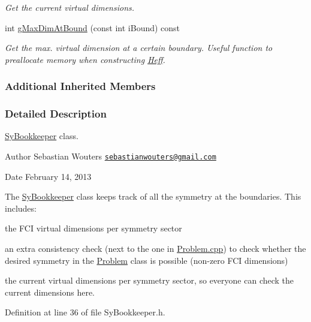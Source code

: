 \begin{DoxyCompactItemize}
\begin{DoxyCompactList}\small\item\em Get the current virtual dimensions. \end{DoxyCompactList}\item 
int \hyperlink{classCheMPS2_1_1SyBookkeeper_ad52f6f852f6f2f88c286579054c1886f}{g\-Max\-Dim\-At\-Bound} (const int i\-Bound) const 
\begin{DoxyCompactList}\small\item\em Get the max. virtual dimension at a certain boundary. Useful function to preallocate memory when constructing \hyperlink{classCheMPS2_1_1Heff}{Heff}. \end{DoxyCompactList}\end{DoxyCompactItemize}
\subsubsection*{Additional Inherited Members}


\subsubsection{Detailed Description}
\hyperlink{classCheMPS2_1_1SyBookkeeper}{Sy\-Bookkeeper} class. \begin{DoxyAuthor}{Author}
Sebastian Wouters \href{mailto:sebastianwouters@gmail.com}{\tt sebastianwouters@gmail.\-com} 
\end{DoxyAuthor}
\begin{DoxyDate}{Date}
February 14, 2013
\end{DoxyDate}
The \hyperlink{classCheMPS2_1_1SyBookkeeper}{Sy\-Bookkeeper} class keeps track of all the symmetry at the boundaries. This includes\-:
\begin{DoxyItemize}
\item the F\-C\-I virtual dimensions per symmetry sector
\item an extra consistency check (next to the one in \hyperlink{Problem_8cpp_source}{Problem.\-cpp}) to check whether the desired symmetry in the \hyperlink{classCheMPS2_1_1Problem}{Problem} class is possible (non-\/zero F\-C\-I dimensions)
\item the current virtual dimensions per symmetry sector, so everyone can check the current dimensions here. 
\end{DoxyItemize}

Definition at line 36 of file Sy\-Bookkeeper.\-h.



